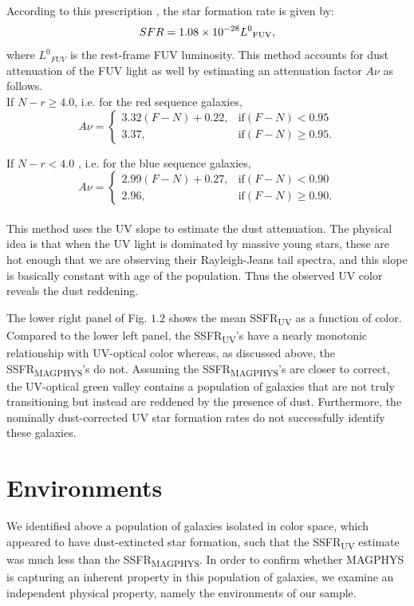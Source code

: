 According to this prescription \citep{salim_uv_2007-1}, 
the star formation rate is given by:
$$ SFR = 1.08 \times 10^{-28}{L^{0}}_{\rm FUV}, $$
where ${L^{0}}_{FUV}$ is the rest-frame FUV luminosity. 
This method accounts for dust attenuation of the 
FUV light as well by estimating an attenuation 
factor $A\nu$ as follows.\\

If $N-r \geq 4.0$, i.e. for the red sequence galaxies,\\

$$ A\nu = \begin{cases} 3.32 (F-N) + 0.22, & \text{if} (F-N) < 0.95\\3.37, & \text{if} (F-N) \geq 0.95. \end{cases}$$

If $N-r < 4.0$ , i.e. for the blue sequence galaxies,\\

$$A\nu = \begin{cases} 2.99(F-N) + 0.27, & \text{if}(F-N) < 0.90\\2.96, & \text{if} (F-N) \geq 0.90. \end{cases}$$\\

This method uses the UV slope to estimate the dust attenuation. The 
physical idea is that when the UV light is dominated by massive young
stars, these are hot enough that we are observing their Rayleigh-Jeans
tail spectra, and this slope is basically constant with age of the
population. Thus the observed UV color reveals the dust reddening.

The lower right panel of Fig. $1.2$ shows the mean 
SSFR\textsubscript{UV} as a function of color. Compared to the 
lower left panel, the SSFR\textsubscript{UV}'s have a nearly 
monotonic relationship with UV-optical color whereas, as discussed 
above, the SSFR\textsubscript{MAGPHYS}'s do not. Assuming 
the SSFR\textsubscript{MAGPHYS}'s are closer to correct, the 
UV-optical green valley contains a population of galaxies that 
are not truly transitioning but instead are reddened by the 
presence of dust. Furthermore, the nominally dust-corrected 
UV star formation rates do not successfully identify these 
galaxies. 



\section{Environments}
\label{ch1_env}
We identified above a population of galaxies isolated in 
color space, which appeared to have dust-extincted star formation, 
such that the SSFR\textsubscript{UV} estimate was much less 
than the SSFR\textsubscript{MAGPHYS}. In order to confirm whether 
MAGPHYS is capturing an inherent property in this population of 
galaxies, we examine an independent physical property, namely 
the environments of our sample.\\

